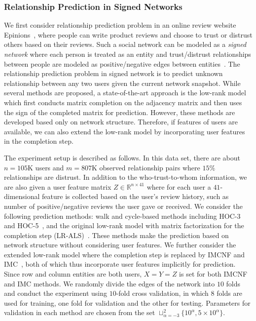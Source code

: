 \documentclass[twoside,11pt]{article}
\def\R{\mathbb{R}}
\begin{document}
\subsubsection{Relationship Prediction in Signed Networks}
\label{subsec:exp.sign_prediction}
We first consider relationship prediction problem
in an online review website Epinions~\citep{Massa06a}, where people can write product reviews
and choose to trust or distrust others based on their reviews.
Such a social network can be modeled
as a {\it signed network} where each person is treated as an entity and
trust/distrust relationships between people are modeled
as positive/negative edges between entities~\citep{Leskovec10a}.
The relationship prediction problem in signed network is
to predict unknown relationship between any two users given the current network snapshot.
While several methods are proposed,
a state-of-the-art approach is the low-rank model~\citep{Hsieh12a, Chiang14a} which
first conducts matrix completion on the adjacency matrix and then
uses the sign of the completed matrix for prediction.  However,
these methods are developed based only on network structure.
Therefore, if features of users are available, we can also extend the low-rank model
by incorporating user features in the completion step.

The experiment setup is described as follows.  In this data set, there are
about $n = 105$K users and $m = 807$K observed relationship pairs where
$15\%$ relationships are distrust.  In addition to the who-trust-to-whom information,
we are also given a user feature matrix $Z \in \R^{n\times 41}$ where for each user
a $41$-dimensional feature is collected based on the user's review history, such as
number of positive/negative reviews the user gave or received.
We consider the following prediction methods:
walk and cycle-based methods including HOC-3 and HOC-5~\citep{Chiang14a},
and the original low-rank model with matrix factorization for the completion step
(LR-ALS)~\citep{Hsieh12a}.  These methods make the prediction based on network structure
without considering user features.  We further consider the
extended low-rank model
where the completion step is replaced by IMCNF and IMC~\citep{Jain13a},
both of which
thus incorporate user features implicitly for prediction.
Since row and column entities are both users,
$X = Y = Z$ is set for both IMCNF and IMC methods.
We randomly divide the edges of the network into $10$ folds and
conduct the experiment using $10$-fold cross validation,
in which $8$ folds are used for training, one fold for validation and the other
for testing.
Parameters for validation in each method are chosen from the set
$\sqcup_{\alpha=-3}^2\{10^\alpha, 5\times 10^\alpha\}$.
\end{document}
